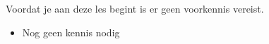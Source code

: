 Voordat je aan deze les begint is er geen voorkennis vereist.
\begin{itemize}
\item Nog geen kennis nodig
\end{itemize}
